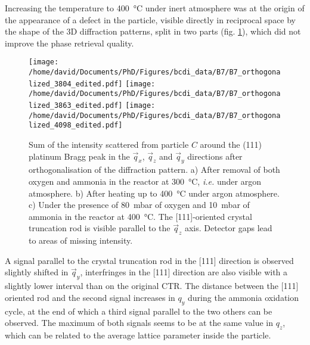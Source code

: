 Increasing the temperature to \qty{400}{\degreeCelsius} under inert atmosphere was at the origin of the appearance of a defect in the particle, visible directly in reciprocal space by the shape of the 3D diffraction patterns, split in two parts (fig. \ref{fig:B7Ortho}), which did not improve the phase retrieval quality.

\begin{figure}[!htb]
    \centering
    \texttt{[image: /home/david/Documents/PhD/Figures/bcdi\_data/B7/B7\_orthogonalized\_3804\_edited.pdf]}
    \texttt{[image: /home/david/Documents/PhD/Figures/bcdi\_data/B7/B7\_orthogonalized\_3863\_edited.pdf]}
    \texttt{[image: /home/david/Documents/PhD/Figures/bcdi\_data/B7/B7\_orthogonalized\_4098\_edited.pdf]}
    \caption{
        Sum of the intensity scattered from particle $C$ around the (111) platinum Bragg peak in the $\vec{q}_x$, $\vec{q}_z$ and $\vec{q}_y$ directions after orthogonalisation of the diffraction pattern.
        a) After removal of both oxygen and ammonia in the reactor at \qty{300}{\degreeCelsius}, \textit{i.e.} under argon atmosphere.
        b) After heating up to \qty{400}{\degreeCelsius} under argon atmosphere.
        c) Under the presence of \qty{80}{\milli\bar} of oxygen and \qty{10}{\milli\bar} of ammonia in the reactor at \qty{400}{\degreeCelsius}.
        The [111]-oriented crystal truncation rod is visible parallel to the $\vec{q}_z$ axis.
        Detector gaps lead to areas of missing intensity.
    }
    \label{fig:B7Ortho}
\end{figure}

A signal parallel to the crystal truncation rod in the [111] direction is observed slightly shifted in $\vec{q}_y$, interfringes in the [111] direction are also visible with a slightly lower interval than on the original CTR.
The distance between the [111] oriented rod and the second signal increases in $q_y$ during the ammonia oxidation cycle, at the end of which a third signal parallel to the two others can be observed.
The maximum of both signals seems to be at the same value in $q_z$, which can be related to the average lattice parameter inside the particle.

